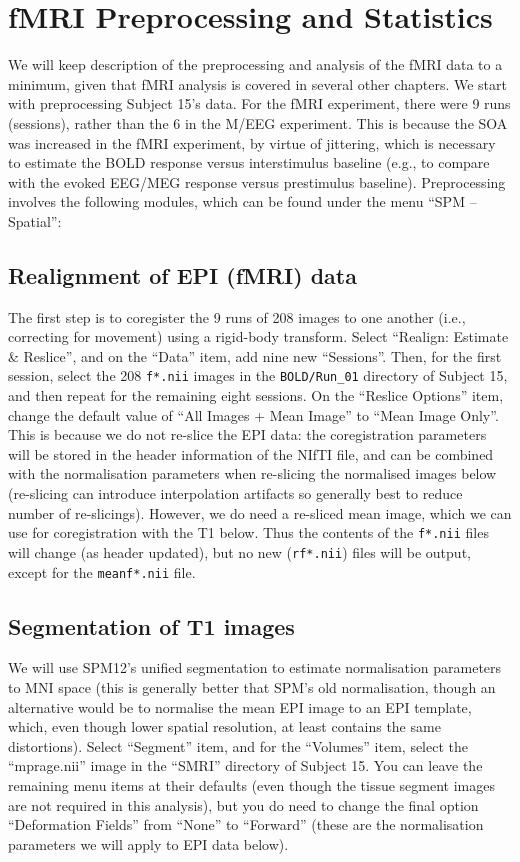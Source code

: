 \section{fMRI Preprocessing and Statistics}

We will keep description of the preprocessing and analysis of the fMRI data to a minimum, given that fMRI analysis is covered in several other chapters. We start with preprocessing Subject 15's data. For the fMRI experiment, there were 9 runs (sessions), rather than the 6 in the M/EEG experiment. This is because the SOA was increased in the fMRI experiment, by virtue of jittering, which is necessary to estimate the BOLD response versus interstimulus baseline (e.g., to compare with the evoked EEG/MEG response versus prestimulus baseline). Preprocessing involves the following modules, which can be found under the menu ``SPM -- Spatial'':

\subsection{Realignment of EPI (fMRI) data}

The first step is to coregister the 9 runs of 208 images to one another (i.e., correcting for movement) using a rigid-body transform. Select ``Realign: Estimate \& Reslice'', and on the ``Data'' item, add nine new ``Sessions''. Then, for the first session, select the 208 \texttt{f*.nii} images in the \texttt{BOLD/Run\_01} directory of Subject 15, and then repeat for the remaining eight sessions. On the ``Reslice Options'' item, change the default value of ``All Images + Mean Image'' to ``Mean Image Only''. This is because we do not re-slice the EPI data: the coregistration parameters will be stored in the header information of the NIfTI file, and can be combined with the normalisation parameters when re-slicing the normalised images below (re-slicing can introduce interpolation artifacts so generally best to reduce number of re-slicings). However, we do need a re-sliced mean image, which we can use for coregistration with the T1 below. Thus the contents of the \texttt{f*.nii} files will change (as header updated), but no new (\texttt{rf*.nii}) files will be output, except for the \texttt{meanf*.nii} file.

\subsection{Segmentation of T1 images}

We will use SPM12's unified segmentation to estimate normalisation parameters to MNI space (this is generally better that SPM's old normalisation, though an alternative would be to normalise the mean EPI image to an EPI template, which, even though lower spatial resolution, at least contains the same distortions). Select ``Segment'' item, and for the ``Volumes'' item, select the ``mprage.nii'' image in the ``SMRI'' directory of Subject 15. You can leave the remaining menu items at their defaults (even though the tissue segment images are not required in this analysis), but you do need to change the final option ``Deformation Fields'' from ``None'' to ``Forward'' (these are the normalisation parameters we will apply to EPI data below).

